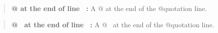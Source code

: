 \documentclass{book}
\begin{document}
\begin{quote}
\textbf{@ at the end of line \ {}:} A @ at the end of the @quotation line.
\end{quote}

\begin{quote}
\textbf{@\ {} at the end of line \ {}:} A @\ {} at the end of the @quotation line.
\end{quote}
\end{document}
